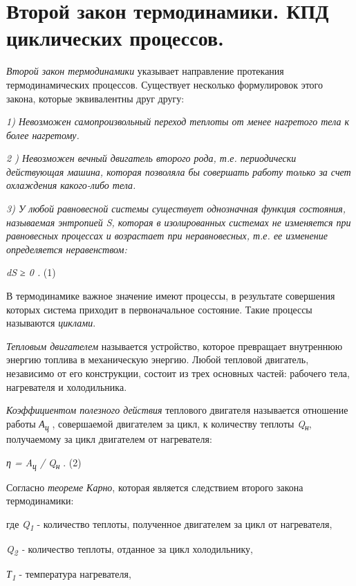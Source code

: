 \chapter{Второй закон термодинамики. КПД циклических процессов.}

\emph{Второй закон термодинамики} указывает направление протекания
термодинамических процессов. Существует несколько формулировок этого
закона, которые эквивалентны друг другу:

\emph{1) Невозможен самопроизвольный переход теплоты от менее нагретого
тела к более нагретому.}

\emph{2 ) Невозможен вечный двигатель второго рода, т.е. периодически
действующая машина, которая позволяла бы совершать работу только за счет
охлаждения какого-либо тела.}

\emph{3) У любой равновесной системы существует однозначная функция
состояния, называемая энтропией S, которая в изолированных системах не
изменяется при равновесных процессах и возрастает при неравновесных,
т.е. ее изменение определяется неравенством:}

\emph{dS ≥ 0 .} (1)

В термодинамике важное значение имеют процессы, в результате совершения
которых система приходит в первоначальное состояние. Такие процессы
называются \emph{циклами}.

\emph{Тепловым двигателем} называется устройство, которое превращает
внутреннюю энергию топлива в механическую энергию. Любой тепловой
двигатель, независимо от его конструкции, состоит из трех основных
частей: рабочего тела, нагревателя и холодильника.

\emph{Коэффициентом полезного действия} теплового двигателя называется
отношение работы \emph{А\textsubscript{ц}} , совершаемой двигателем за
цикл, к количеству теплоты \emph{Q\textsubscript{н}}, получаемому за
цикл двигателем от нагревателя:

\emph{η = A\textsubscript{ц} / Q\textsubscript{н}} . (2)

Согласно \emph{теореме Карно}, которая является следствием второго
закона термодинамики: %

где \emph{Q\textsubscript{1}} - количество теплоты, полученное
двигателем за цикл от нагревателя,

\emph{Q\textsubscript{2} -} количество теплоты, отданное за цикл
холодильнику,

\emph{Т\textsubscript{1}} - температура нагревателя,

